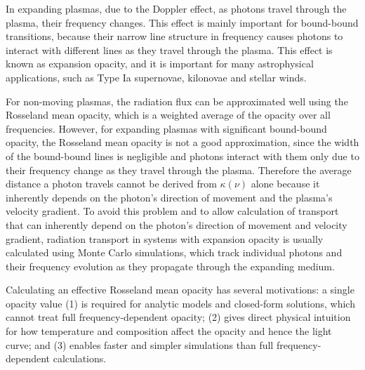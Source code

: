 \documentclass[final,5p,times,twocolumn]{elsarticle}
\begin{document}
    In expanding plasmas, due to the Doppler effect, as photons travel through the plasma, their frequency changes. 
    This effect is mainly important for bound-bound transitions, because their narrow line structure in frequency causes photons to interact 
    with different lines as they travel through the plasma.
    This effect is known as expansion opacity, and it is important for many astrophysical applications, such as Type Ia supernovae,
    kilonovae and stellar winds. 

    For non-moving plasmas, the radiation flux can be approximated well using the Rosseland mean opacity, which is a weighted
    average of the opacity over all frequencies. However, for expanding plasmas with significant bound-bound opacity, the Rosseland mean 
    opacity is not a good approximation, since the width of the bound-bound lines is negligible and photons interact with them only due to their
    frequency change as they travel through the plasma. 
    Therefore the average distance a photon travels cannot be derived from $\kappa(\nu)$
    alone because it inherently depends on the photon's direction of movement and the plasma's velocity gradient.
    To avoid this problem and to allow calculation of transport that can inherently depend on the photon's direction of movement and
    velocity gradient, radiation transport in systems with expansion opacity is usually calculated using Monte Carlo simulations,
    which track individual photons and their frequency evolution as they propagate through the expanding medium.

    Calculating an effective Rosseland mean opacity has several motivations: a single opacity value 
    (1) is required for analytic 
    models and closed-form solutions, which cannot treat full frequency-dependent opacity; (2) gives direct physical 
    intuition for how temperature and composition affect the opacity and hence the light curve; and (3) enables 
    faster and simpler simulations than full frequency-dependent calculations. 
\end{document}
